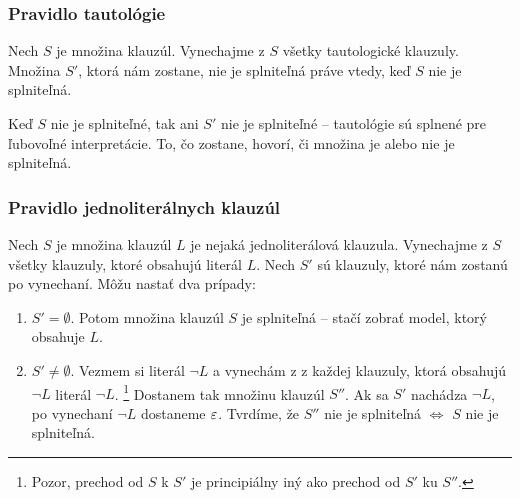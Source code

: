 \subsubsection{Pravidlo tautológie} 
Nech $S$ je množina klauzúl.
Vynechajme z $S$ všetky tautologické klauzuly.
Množina $S'$, ktorá nám zostane, nie je splniteľná práve vtedy,
keď $S$ nie je splniteľná.

\begin{dokaz}
    Keď $S$ nie je splniteľné, tak ani $S'$ nie je splniteľné --
    tautológie sú splnené pre ľubovoľné interpretácie.
    To, čo zostane, hovorí, či množina je alebo nie je splniteľná.
\end{dokaz}

\subsubsection{Pravidlo jednoliterálnych klauzúl}
Nech $S$ je množina klauzúl $L$ je nejaká jednoliterálová klauzula.
Vynechajme z $S$ všetky klauzuly, ktoré obsahujú literál $L$.
Nech $S'$ sú klauzuly, ktoré nám zostanú po vynechaní.
Môžu nastať dva prípady:
\begin{enumerate}
    \item $S' = \emptyset$. Potom množina klauzúl $S$ je splniteľná --
        stačí zobrať model, ktorý obsahuje $L$.

    \item $S' \neq \emptyset$. Vezmem si literál $\neg L$ a vynechám z
        z každej klauzuly, ktorá obsahujú $\neg L$ literál $\neg L$.%
        \footnote{Pozor, prechod od $S$ k $S'$ je principiálny iný ako
            prechod od $S'$ ku $S''$.}
        Dostanem tak množinu klauzúl $S''$.
        Ak sa $S'$ nachádza $\neg L$, po vynechaní
        $\neg L$ dostaneme $\varepsilon$.
        Tvrdíme, že $S''$ nie je splniteľná
        $\iff$ $S$ nie je splniteľná.
\end{enumerate}

